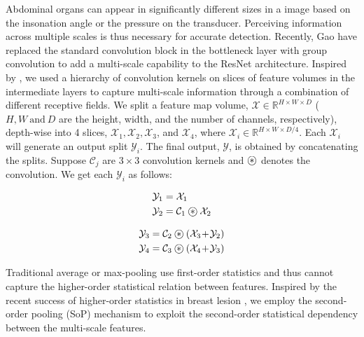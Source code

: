 %
Abdominal organs can appear in significantly different sizes in a \usg image based on the insonation angle or the pressure on the transducer. Perceiving information across multiple scales is thus necessary for accurate \gbc detection. Recently, Gao \etal \cite{res2net} have replaced the standard convolution block in the bottleneck layer with group convolution to add a multi-scale capability to the ResNet architecture. Inspired by \cite{res2net}, we used a hierarchy of convolution kernels on slices of feature volumes in the intermediate layers to capture multi-scale information through a combination of different receptive fields. We split a feature map volume, $\mathcal{X} \!\in\!\mathbb{R}^{H\!\times\! W \!\times\! D}$ ($H, W ~\text{and}~D$ are the height, width, and the number of channels, respectively), depth-wise into 4 slices, $\mathcal{X}_1,\mathcal{X}_2,\mathcal{X}_3$, and $\mathcal{X}_4$, where $\mathcal{X}_i \!\in\! \mathbb{R}^{H\!\times\! W\!\times\! D/4}$. Each $\mathcal{X}_i$ will generate an output split $\mathcal{Y}_i$. The final output, $\mathcal{Y}$, is obtained by concatenating the splits. Suppose $\mathcal{C}_j$ are $3\!\times\!3$ convolution kernels and $\oast$ denotes the convolution. We get each $\mathcal{Y}_i$ as follows:
\linebreak
\begin{minipage}{.4\linewidth}
\vspace{-1em}
\begin{align}
    \mathcal{Y}_1 &= \mathcal{X}_1 \\
    \mathcal{Y}_2 &= \mathcal{C}_1 \oast \mathcal{X}_2
\end{align}
\end{minipage}
\begin{minipage}{.6\linewidth}
\vspace{-1em}
\begin{align}
    \mathcal{Y}_3 &= \mathcal{C}_2 \oast (\mathcal{X}_3 \!+\! \mathcal{Y}_2) \\
    \mathcal{Y}_4 &= \mathcal{C}_3 \oast (\mathcal{X}_4 \!+\! \mathcal{Y}_3)
\end{align}
\end{minipage}

%
Traditional average or max-pooling use first-order statistics and thus cannot capture the higher-order statistical relation between features. Inspired by the recent success of higher-order statistics in breast lesion \usg \cite{ning2020multi, zhu2020second}, we employ the second-order pooling (SoP) mechanism to exploit the second-order statistical dependency between the multi-scale features.  

